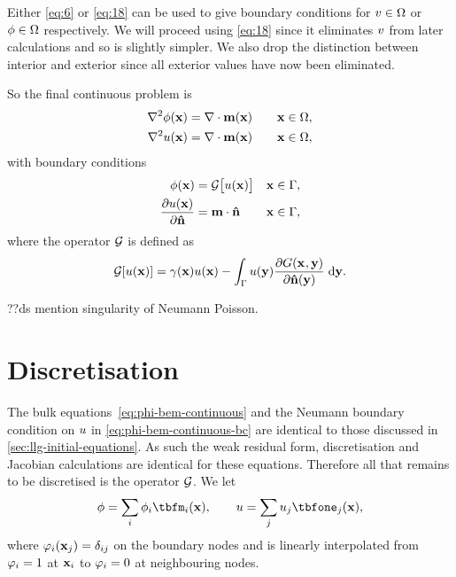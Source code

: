 Either \cref{eq:6} or \cref{eq:18} can be used to give boundary conditions for $v \in \Omega$ or $\phi \in \Omega$ respectively.
We will proceed using \cref{eq:18} since it eliminates $v$ from later calculations and so is slightly simpler.
We also drop the distinction between interior and exterior since all exterior values have now been eliminated.

So the final continuous problem is
\begin{equation}
  \begin{aligned}
    \nabla^2 \phi(\boldsymbol{\mathrm{x}}) &= \nabla \cdot \boldsymbol{\mathrm{m}}(\boldsymbol{\mathrm{x}}) \quad & \boldsymbol{\mathrm{x}} \in \Omega, \\
    \nabla^2 u(\boldsymbol{\mathrm{x}}) &= \nabla \cdot \boldsymbol{\mathrm{m}}(\boldsymbol{\mathrm{x}})    & \boldsymbol{\mathrm{x}} \in \Omega,
  \end{aligned}
  \label{eq:phi-bem-continuous}
\end{equation}
with boundary conditions
\begin{equation}
  \begin{aligned}
    \phi(\boldsymbol{\mathrm{x}}) &= \mathcal{G} \big[ u(\boldsymbol{\mathrm{x}}) \big]      & \boldsymbol{\mathrm{x}} \in {\Gamma}, \\
    \frac{\partial u(\boldsymbol{\mathrm{x}})}{\partial \boldsymbol{\mathrm{\hat{n}}}} &= \boldsymbol{\mathrm{m}} \cdot \boldsymbol{\mathrm{\hat{n}}}  & \boldsymbol{\mathrm{x}} \in {\Gamma},
    \label{eq:phi-bem-continuous-bc}
  \end{aligned}
\end{equation}
where the operator $\mathcal{G}$ is defined as
\begin{equation}
  \mathcal{G} {\left[ u(\boldsymbol{\mathrm{x}}) \right]} = \gamma(\boldsymbol{\mathrm{x}}) u(\boldsymbol{\mathrm{x}})
        - \int_{{\Gamma}} u(\boldsymbol{\mathrm{y}}) \frac{\partial G(\boldsymbol{\mathrm{x}}_{},\boldsymbol{\mathrm{y}})}{\partial \boldsymbol{\mathrm{\hat{n}}}(\boldsymbol{\mathrm{y}})} {\; \mathrm{{d}}} \boldsymbol{\mathrm{y}}.
\end{equation}

??ds mention singularity of Neumann Poisson.

\section{Discretisation}
\label{sec:discretisation}

\newsubcommand{\tbfone}{\tbf}{}
\newsubcommand{\tbfm}{\tbf}{}

The bulk equations~\cref{eq:phi-bem-continuous} and the Neumann boundary condition on $u$ in \cref{eq:phi-bem-continuous-bc} are identical to those discussed in \cref{sec:llg-initial-equations}.
As such the weak residual form, discretisation and Jacobian calculations are identical for these equations.
Therefore all that remains to be discretised is the operator $\mathcal{G}$.
We let
\begin{equation}
  \phim = \sum_\ibasis \phim_{\ibasis} \tbfm_{\ibasis}(\xv),
  \qquad
  \phione = \sum_\ibasisb \phione_{\ibasisb} \tbfone_{\ibasisb}(\xv),
  \label{eq:25}
\end{equation}
where $\varphi_{i}(\boldsymbol{\mathrm{x}}_{j}) = \delta_{{i} {j}}$ on the boundary nodes and is linearly interpolated from $\varphi_{i} = 1$ at $\boldsymbol{\mathrm{x}}_{i}$ to $\varphi_{i} = 0$ at neighbouring nodes.

